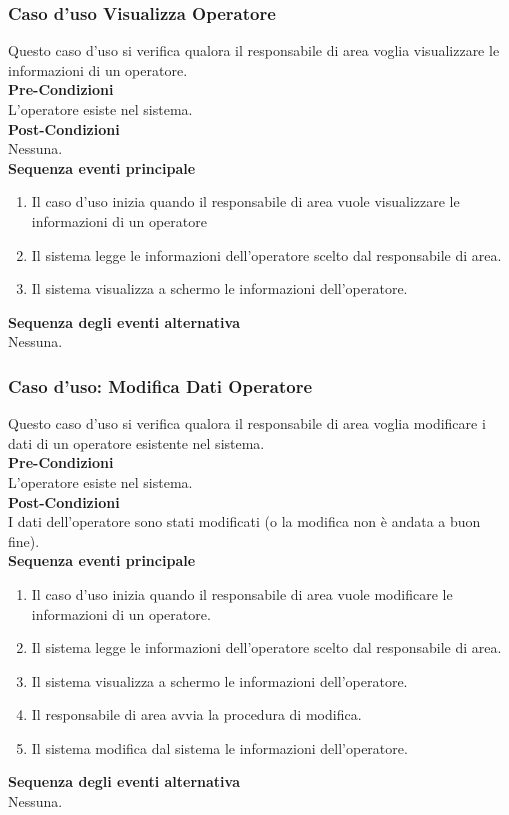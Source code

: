 \documentclass[green, fancy, 11pt]{elegantbook}
\begin{document}
\subsubsection{Caso d'uso Visualizza Operatore}
\noindent
Questo caso d’uso si verifica qualora il responsabile di area voglia visualizzare le informazioni di un operatore.\\
\textbf{Pre-Condizioni}\\
L’operatore esiste nel sistema.\\
\textbf{Post-Condizioni}\\
Nessuna.\\
\textbf{Sequenza eventi principale}
\begin{enumerate}
	\item Il caso d’uso inizia quando il responsabile di area vuole visualizzare le informazioni di un operatore
	\item Il sistema legge le informazioni dell’operatore scelto dal responsabile di area.
	\item Il sistema visualizza a schermo le informazioni dell’operatore.
\end{enumerate}
\textbf{Sequenza degli eventi alternativa}\\
Nessuna.

\subsubsection{Caso d'uso: Modifica Dati Operatore}
\noindent
Questo caso d’uso si verifica qualora il responsabile di area voglia modificare i dati di un operatore esistente nel sistema.\\
\textbf{Pre-Condizioni}\\
L’operatore esiste nel sistema.\\
\textbf{Post-Condizioni}\\
I dati dell'operatore sono stati modificati (o la modifica non è andata a buon fine).\\
\textbf{Sequenza eventi principale}
\begin{enumerate}
	\item Il caso d’uso inizia quando il responsabile di area vuole modificare le informazioni di un operatore.
	\item Il sistema legge le informazioni dell’operatore scelto dal responsabile di area.
	\item Il sistema visualizza a schermo le informazioni dell’operatore.
	\item Il responsabile di area avvia la procedura di modifica.
	\item Il sistema modifica dal sistema le informazioni dell’operatore.
\end{enumerate}
\textbf{Sequenza degli eventi alternativa}\\
Nessuna.
\end{document}
